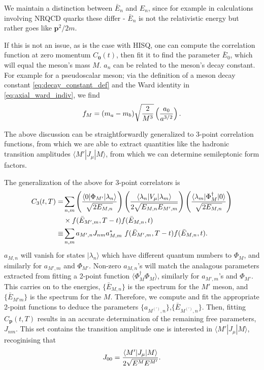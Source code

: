 We maintain a distinction between $\bar{E}_n$ and $E_n$, since for example in calculations involving NRQCD quarks these differ - $\bar{E}_n$ is not the relativistic energy but rather goes like ${\textbf{p}}^2/2m$.

If this is not an issue, as is the case with HISQ, one can compute the correlation function at zero momentum $C_{{\textbf{0}}}(t)$, then fit it to find the parameter $\bar{E}_0$, which will equal the meson's mass $M$. $a_n$ can be related to the meson's decay constant. For example for a pseudoscalar meson; via the definition of a meson decay constant \eqref{eq:decay_constant_def} and the Ward identity in \eqref{eq:axial_ward_indiv}, we find
\begin{align}
  f_M = (m_a-m_b) \sqrt{2\over M^3} \left({a_0\over a^{3/2}}\right).
  \label{eq:decayconstant_pseudoscalar}
\end{align}

The above discussion can be straightforwardly generalized to 3-point correlation functions, from which we are able to extract quantities like the hadronic transition amplitudes $\langle M' | J_{\mu} | M \rangle$, from which we can determine semileptonic form factors.

The generalization of the above for 3-point correlators is
\begin{align}
  \nonumber
  C_3(t,T) =& \sum_{n,m}  \left( {\langle 0 | \Phi_{M'} | \lambda_n \rangle \over \sqrt{2E_{M,n}}} \right) \left({\langle \lambda_n | V_{\mu} | \lambda_m \rangle \over 2\sqrt{ E_{M,n} E_{M',m} } }\right) \left( {\langle \lambda_m | \Phi_{M}^{\dagger} | 0 \rangle \over \sqrt{2E_{M,n}} } \right) \\ \nonumber &\times f(\bar{E}_{M',m},T-t) f(\bar{E}_{M,n},t) \\
  \equiv& \sum_{n,m} a_{M',n} J_{nm} a^*_{M,m} \,\, f(\bar{E}_{M',m},T-t) f(\bar{E}_{M,n},t).
  \label{eq:3ptfitfunction}
\end{align}
$a_{M,n}$ will vanish for states $|\lambda_n\rangle$ which have different quantum numbers to $\Phi_{M}$, and similarly for $a_{M',m}$ and $\Phi_{M'}$. Non-zero $a_{M,n}$'s will match the analagous parameters extracted from fitting a 2-point function $\langle \Phi_{M}^{\dagger} \Phi_{M} \rangle$, similarly for $a_{M',m}$'s and $\Phi_{M'}$. This carries on to the energies, $\{\bar{E}_{M,n}\}$ is the spectrum for the $M'$ meson, and $\{\bar{E}_{M'm}\}$ is the spectrum for the $M$. Therefore, we compute and fit the appropriate 2-point functions to deduce the parameters $\{a_{M^{(')},n}\}$,$\{\bar{E}_{M^{(')},n}\}$. Then, fitting $C_{\textbf{p}}(t,T)$ results in an accurate determination of the remaining free parameters, $J_{nm}$. This set contains the transition amplitude one is interested in $\langle M' | J_{\mu} | M \rangle$, recoginising that
\begin{align}
  J_{00} = {\langle M' | J_{\mu} | M \rangle \over 2\sqrt{E^{M} E^{M'} } }.
\end{align}

